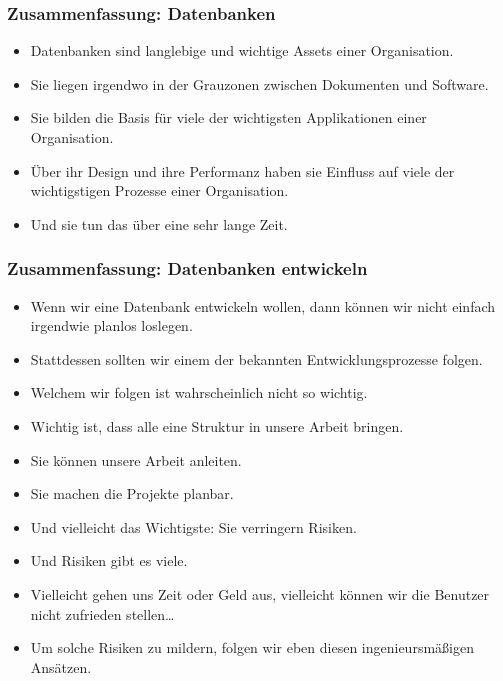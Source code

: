 \documentclass[aspectratio=169,mathserif,notheorems]{beamer}%
\begin{document}
%
\begin{frame}%
\frametitle{Zusammenfassung: Datenbanken}%
\begin{itemize}%
\item Datenbanken sind langlebige und wichtige Assets einer Organisation.%
%
\item<2-> Sie liegen irgendwo in der Grauzonen zwischen Dokumenten und Software.%
%
\item<3-> Sie bilden die Basis für viele der wichtigsten Applikationen einer Organisation.%
%
\item<4-> Über ihr Design und ihre Performanz haben sie Einfluss auf viele der wichtigstigen Prozesse einer Organisation.%
%
\item<5-> Und sie tun das über eine sehr lange Zeit.%
\end{itemize}%
\end{frame}%
%
\begin{frame}%
\frametitle{Zusammenfassung: Datenbanken entwickeln}%
%
\begin{itemize}%
\item Wenn wir eine Datenbank entwickeln wollen, dann können wir nicht einfach irgendwie planlos loslegen.%
%
\item<2-> Stattdessen sollten wir einem der bekannten Entwicklungsprozesse folgen.%
%
\item<3-> Welchem wir folgen ist wahrscheinlich nicht so wichtig.%
%
\item<4-> Wichtig ist, dass alle eine Struktur in unsere Arbeit bringen.%
%
\item<5-> Sie können unsere Arbeit anleiten.%
%
\item<6-> Sie machen die Projekte planbar.%
%
\item<7-> Und vielleicht das Wichtigste: Sie verringern Risiken.%
%
\item<8-> Und Risiken gibt es viele.%
%
\item<9-> Vielleicht gehen uns Zeit oder Geld aus, vielleicht können wir die Benutzer nicht zufrieden stellen\dots%
%
\item<10-> Um solche Risiken zu mildern, folgen wir eben diesen ingenieursmäßigen Ansätzen.%
\end{itemize}%
\end{frame}%
%
\end{document}
